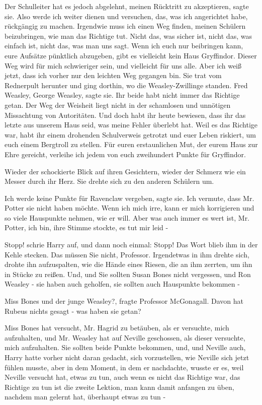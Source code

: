 \glqq{}Der Schulleiter hat es jedoch abgelehnt, meinen Rücktritt zu
akzeptieren\grqq{}, sagte sie. \glqq{}Also werde ich weiter dienen und versuchen,
das, was ich angerichtet habe, rückgängig zu machen. Irgendwie muss ich einen
Weg finden, meinen Schülern beizubringen, wie man das Richtige tut. Nicht das,
was sicher ist, nicht das, was einfach ist, nicht das, was man uns sagt. Wenn
ich euch nur beibringen kann, eure Aufsätze pünktlich abzugeben, gibt es
vielleicht kein Haus Gryffindor. Dieser Weg wird für mich schwieriger sein, und
vielleicht für uns alle. Aber ich weiß jetzt, dass ich vorher nur den leichten
Weg gegangen bin.\grqq{} Sie trat vom Rednerpult herunter und ging dorthin, wo
die Weasley-Zwillinge standen. \glqq{}Fred Weasley, George Weasley\grqq{}, sagte
sie. \glqq{}Ihr beide habt nicht immer das Richtige getan. Der Weg der Weisheit
liegt nicht in der schamlosen und unnötigen Missachtung von Autoritäten. Und
doch habt ihr heute bewiesen, dass ihr das letzte aus unserem Haus seid, was
meine Fehler überlebt hat. Weil es das Richtige war, habt ihr einem drohenden
Schulverweis getrotzt und euer Leben riskiert, um euch einem Bergtroll zu
stellen. Für euren erstaunlichen Mut, der eurem Haus zur Ehre gereicht, verleihe
ich jedem von euch zweihundert Punkte für Gryffindor.\grqq{}

Wieder der schockierte Blick auf ihren Gesichtern, wieder der Schmerz wie ein
Messer durch ihr Herz. Sie drehte sich zu den anderen Schülern um.

\glqq{}Ich werde keine Punkte für Ravenclaw vergeben\grqq{}, sagte sie. \glqq{}Ich
vermute, dass Mr. Potter sie nicht haben möchte. Wenn ich mich irre, kann er
mich korrigieren und so viele Hauspunkte nehmen, wie er will. Aber was auch
immer es wert ist, Mr. Potter, ich bin\grqq{}, ihre Stimme stockte, \glqq{}es tut
mir leid -\grqq{}

\glqq{}Stopp!\grqq{} schrie Harry auf, und dann noch einmal: \glqq{}Stopp!\grqq{}
Das Wort blieb ihm in der Kehle stecken. \glqq{}Das müssen Sie nicht,
Professor.\grqq{} Irgendetwas in ihm drehte sich, drohte ihn aufzuspalten, wie
die Hände eines Riesen, die an ihm zerrten, um ihn in Stücke zu reißen. \glqq{}
Und, und Sie sollten Susan Bones nicht vergessen, und Ron Weasley - sie haben
auch geholfen, sie sollten auch Hauspunkte bekommen -\grqq{}

\glqq{}Miss Bones und der junge Weasley?\grqq{}, fragte Professor McGonagall.
\glqq{}Davon hat Rubeus nichts gesagt - was haben sie getan?\grqq{}

\glqq{}Miss Bones hat versucht, Mr. Hagrid zu betäuben, als er versuchte, mich
aufzuhalten, und Mr. Weasley hat auf Neville geschossen, als dieser versuchte,
mich aufzuhalten. Sie sollten beide Punkte bekommen, und, und Neville
auch\grqq{}, Harry hatte vorher nicht daran gedacht, sich vorzustellen, wie
Neville sich jetzt fühlen musste, aber in dem Moment, in dem er nachdachte,
wusste er es, \glqq{}weil Neville versucht hat, etwas zu tun, auch wenn es nicht
das Richtige war, das Richtige zu tun ist die zweite Lektion, man kann damit
anfangen zu üben, nachdem man gelernt hat, überhaupt etwas zu tun -\grqq{}

